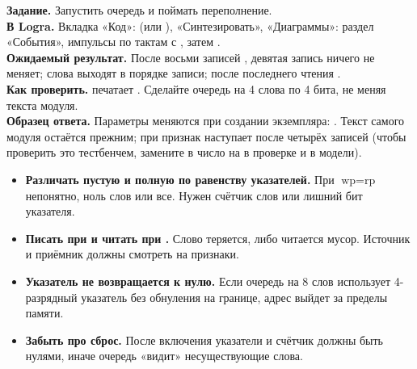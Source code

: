 \begin{diybox}
\textbf{Задание.} Запустить очередь и поймать переполнение.\\
\textbf{В Logra.} Вкладка «Код»:  (или ),
«Синтезировать», «Диаграммы»: раздел «События», импульсы  по тактам
с , затем .\\
\textbf{Ожидаемый результат.} После восьми записей , девятая
запись ничего не меняет; слова выходят в порядке записи; после последнего
чтения .\\
\textbf{Как проверить.}  печатает .
 Сделайте очередь на 4 слова по 4 бита, не меняя текста модуля.\\
\textbf{Образец ответа.} Параметры меняются при создании экземпляра:
. Текст самого модуля
остаётся прежним; при  признак  наступает после четырёх
записей (чтобы проверить это тестбенчем, замените в 
число  на  в проверке и в модели).
\end{diybox}


\begin{warnbox}
\begin{itemize}
  \item \textbf{Различать пустую и полную по равенству указателей.} При
        $\text{wp}=\text{rp}$ непонятно, ноль слов или все. Нужен счётчик слов
        или лишний бит указателя.
  \item \textbf{Писать при  и читать при .} Слово
        теряется, либо читается мусор. Источник и приёмник должны смотреть на
        признаки.
  \item \textbf{Указатель не возвращается к нулю.} Если очередь на 8 слов
        использует 4-разрядный указатель без обнуления на границе, адрес
        выйдет за пределы памяти.
  \item \textbf{Забыть про сброс.} После включения указатели и счётчик
        должны быть нулями, иначе очередь «видит» несуществующие слова.
\end{itemize}
\end{warnbox}

